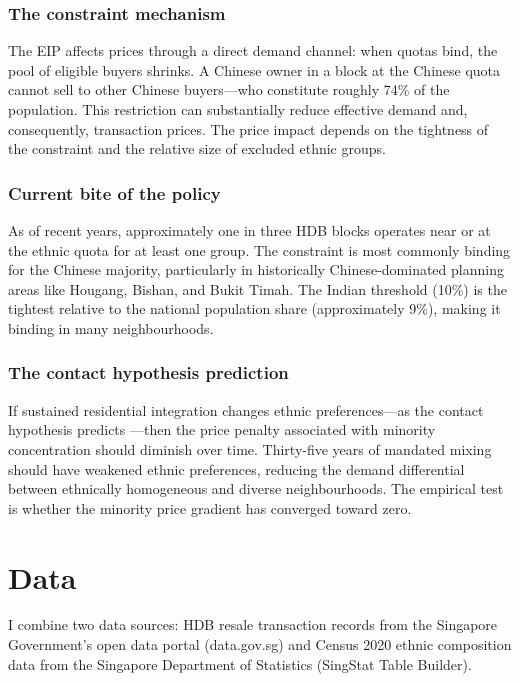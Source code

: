 \documentclass[12pt]{article}
\begin{document}
\subsubsection*{The constraint mechanism} The EIP affects prices through a direct demand channel: when quotas bind, the pool of eligible buyers shrinks. A Chinese owner in a block at the Chinese quota cannot sell to other Chinese buyers---who constitute roughly 74\% of the population. This restriction can substantially reduce effective demand and, consequently, transaction prices. The price impact depends on the tightness of the constraint and the relative size of excluded ethnic groups.

\subsubsection*{Current bite of the policy} As of recent years, approximately one in three HDB blocks operates near or at the ethnic quota for at least one group. The constraint is most commonly binding for the Chinese majority, particularly in historically Chinese-dominated planning areas like Hougang, Bishan, and Bukit Timah. The Indian threshold (10\%) is the tightest relative to the national population share (approximately 9\%), making it binding in many neighbourhoods.

\subsubsection*{The contact hypothesis prediction} If sustained residential integration changes ethnic preferences---as the contact hypothesis predicts \citep{pettigrew2006, paluck2019}---then the price penalty associated with minority concentration should diminish over time. Thirty-five years of mandated mixing should have weakened ethnic preferences, reducing the demand differential between ethnically homogeneous and diverse neighbourhoods. The empirical test is whether the minority price gradient has converged toward zero.


\section{Data}
\label{sec:data}

I combine two data sources: HDB resale transaction records from the Singapore Government's open data portal (data.gov.sg) and Census 2020 ethnic composition data from the Singapore Department of Statistics (SingStat Table Builder).
\end{document}

